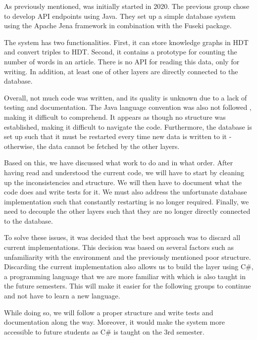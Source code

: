 As previously mentioned, \knox{} was initially started in 2020.
The previous group chose to develop API endpoints using Java.
They set up a simple database system using the Apache Jena framework in combination with the Fuseki package.

The system has two functionalities. 
First, it can store knowledge graphs in HDT and convert triples to HDT.
Second, it contains a prototype for counting the number of words in an article.
There is no API for reading this data, only for writing. 
In addition, at least one of other layers are directly connected to the database.

Overall, not much code was written, and its quality is unknown due to a lack of testing and documentation.
The Java language convention was also not followed \cite{java_convention}, making it difficult to comprehend.
It appears as though no structure was established, making it difficult to navigate the code. 
Furthermore, the database is set up such that it must be restarted every time new data is written to it - otherwise, the data cannot be fetched by the other layers.

Based on this, we have discussed what work to do and in what order.
After having read and understood the current code, we will have to start by cleaning up the inconsistencies and structure.
We will then have to document what the code does and write tests for it.
We must also address the unfortunate database implementation such that constantly restarting is no longer required.
Finally, we need to decouple the other layers such that they are no longer directly connected to the database.

To solve these issues, it was decided that the best approach was to discard all current implementations. 
This decision was based on several factors such as unfamiliarity with the environment and the previously mentioned poor structure. 
Discarding the current implementation also allows us to build the layer using C\#, a programming language that we are more familiar with which is also taught in the future semesters. 
This will make it easier for the following groups to continue and not have to learn a new language.

While doing so, we will follow a proper structure and write tests and documentation along the way. 
Moreover, it would make the system more accessible to future students as C\# is taught on the 3rd semester.
